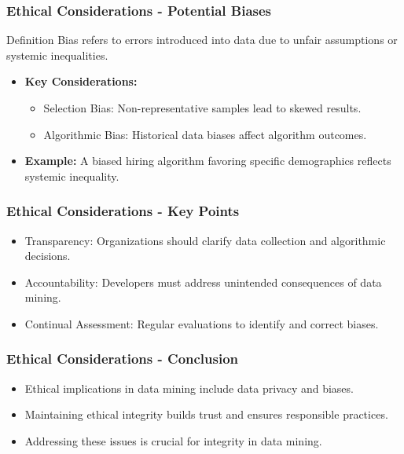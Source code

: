 \documentclass[aspectratio=169]{beamer}
\begin{document}
\begin{frame}[fragile]
    \frametitle{Ethical Considerations - Potential Biases}
    \begin{block}{Definition}
        Bias refers to errors introduced into data due to unfair assumptions or systemic inequalities.
    \end{block}
    \begin{itemize}
        \item \textbf{Key Considerations:}
        \begin{itemize}
            \item Selection Bias: Non-representative samples lead to skewed results.
            \item Algorithmic Bias: Historical data biases affect algorithm outcomes.
        \end{itemize}
        \item \textbf{Example:} 
        A biased hiring algorithm favoring specific demographics reflects systemic inequality.
    \end{itemize}
\end{frame}

\begin{frame}[fragile]
    \frametitle{Ethical Considerations - Key Points}
    \begin{itemize}
        \item Transparency: Organizations should clarify data collection and algorithmic decisions.
        \item Accountability: Developers must address unintended consequences of data mining.
        \item Continual Assessment: Regular evaluations to identify and correct biases.
    \end{itemize}
\end{frame}

\begin{frame}[fragile]
    \frametitle{Ethical Considerations - Conclusion}
    \begin{itemize}
        \item Ethical implications in data mining include data privacy and biases.
        \item Maintaining ethical integrity builds trust and ensures responsible practices.
        \item Addressing these issues is crucial for integrity in data mining.
    \end{itemize}
\end{frame}
\end{document}

